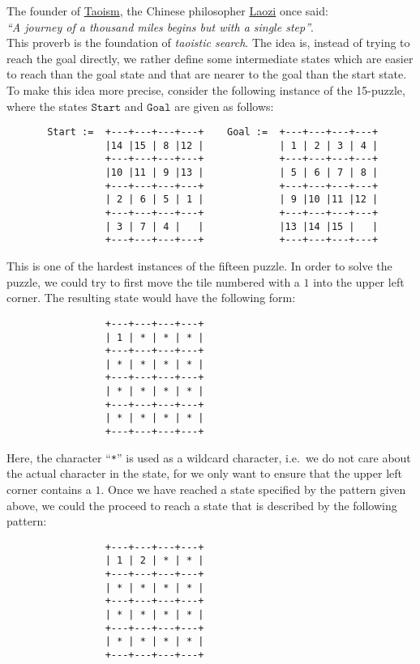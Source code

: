 \exercise
The founder of \href{https://en.wikipedia.org/wiki/Taoism}{Taoism}, the Chinese philosopher
\href{https://en.wikipedia.org/wiki/Laozi}{Laozi} once said: 
\\[0.2cm]
\hspace*{1.3cm}
\textsl{``A journey of a thousand miles begins but with a single step''}.
\\[0.2cm]
This proverb is the foundation of \emph{\color{blue}taoistic search}.  The idea is, instead of trying to reach
the goal directly, we rather define some intermediate states which are easier to reach than the goal state and
that are nearer to the goal than the start state.  To make this idea more precise, consider the following instance of the
15-puzzle, where the states $\mathtt{Start}$ and $\mathtt{Goal}$ are given as follows:
\begin{verbatim}
       Start :=  +---+---+---+---+    Goal :=  +---+---+---+---+
                 |14 |15 | 8 |12 |             | 1 | 2 | 3 | 4 |
                 +---+---+---+---+             +---+---+---+---+
                 |10 |11 | 9 |13 |             | 5 | 6 | 7 | 8 |
                 +---+---+---+---+             +---+---+---+---+
                 | 2 | 6 | 5 | 1 |             | 9 |10 |11 |12 |
                 +---+---+---+---+             +---+---+---+---+
                 | 3 | 7 | 4 |   |             |13 |14 |15 |   |
                 +---+---+---+---+             +---+---+---+---+
\end{verbatim}
This is one of the hardest instances of the fifteen puzzle.  In order to solve the puzzle, we could try to
first move the tile numbered with a $1$ into the upper left corner.  The resulting state would have the
following form:
\begin{verbatim}
                 +---+---+---+---+
                 | 1 | * | * | * |
                 +---+---+---+---+
                 | * | * | * | * |
                 +---+---+---+---+
                 | * | * | * | * |
                 +---+---+---+---+
                 | * | * | * | * |
                 +---+---+---+---+
\end{verbatim}
Here, the character ``\texttt{*}'' is used as a wildcard character, i.e.~we do not care about the actual
character in the state, for we only want to ensure that the upper left corner contains a $1$.  Once we have reached a
state specified by the pattern given above, we could the proceed to reach a state that is described by the
following pattern:
\begin{verbatim}
                 +---+---+---+---+
                 | 1 | 2 | * | * |
                 +---+---+---+---+
                 | * | * | * | * |
                 +---+---+---+---+
                 | * | * | * | * |
                 +---+---+---+---+
                 | * | * | * | * |
                 +---+---+---+---+
\end{verbatim}
